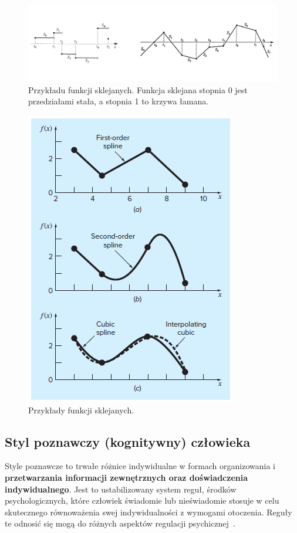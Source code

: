 \documentclass[wi]{zut}
\begin{document}
\begin{figure}[H]
    \centering
    \includegraphics[width=0.8\linewidth]{images/spline.png}
    \caption{Przykładu funkcji sklejanych. Funkcja sklejana stopnia 0 jest przedziałami stała, a stopnia 1 to krzywa łamana.}
    \label{fig:spline}
\end{figure}


\begin{figure}[H]
    \centering
    \includegraphics[width=0.5\linewidth]{images/spline2.png}
    \caption{Przykłady funkcji sklejanych.}
    \label{fig:spline2}
\end{figure}

\subsection{Styl poznawczy (kognitywny) człowieka}

Style poznawcze to trwałe różnice indywidualne w formach organizowania i \textbf{przetwarzania informacji zewnętrznych oraz doświadczenia indywidualnego}. Jest to ustabilizowany system reguł, środków psychologicznych, które człowiek świadomie lub nieświadomie stosuje w celu skutecznego równoważenia swej indywidualności z wymogami otoczenia. Reguły te odnosić się mogą do różnych aspektów regulacji psychicznej~\cite{bator1991wyznaczniki}.
\end{document}
